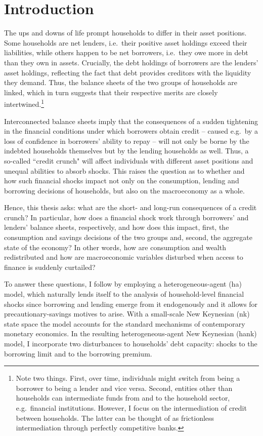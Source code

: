 \documentclass[a4paper,12pt]{article} %
\numberwithin{equation}{section} %
\numberwithin{figure}{section}
\numberwithin{table}{section}
\begin{document}
\section{Introduction}
\label{sec:introduction}

The ups and downs of life prompt households to differ in their asset positions. Some households are net lenders, i.e.~their positive asset holdings exceed their liabilities, while others happen to be net borrowers, i.e.~they owe more in debt than they own in assets. Crucially, the debt holdings of borrowers are the lenders' asset holdings, reflecting the fact that debt provides creditors with the liquidity they demand. Thus, the balance sheets of the two groups of households are linked, which in turn suggests that their respective merits are closely intertwined.\footnote{Note two things. First, over time, individuals might switch from being a borrower to being a lender and vice versa. Second, entities other than households can intermediate funds from and to the household sector, e.g.~financial institutions. However, I focus on the intermediation of credit between households. The latter can be thought of as frictionless intermediation through perfectly competitive banks.}

Interconnected balance sheets imply that the consequences of a sudden tightening in the financial conditions under which borrowers obtain credit -- caused e.g.~by a loss of confidence in borrowers' ability to repay -- will not only be borne by the indebted households themselves but by the lending households as well. Thus, a so-called ``credit crunch" will affect individuals with different asset positions and unequal abilities to absorb shocks. This raises the question as to whether and how such financial shocks impact not only on the consumption, lending and borrowing decisions of households, but also on the macroeconomy as a whole. 

Hence, this thesis asks: what are the short- and long-run consequences of a credit crunch? In particular, how does a financial shock work through borrowers' and lenders' balance sheets, respectively, and how does this impact, first, the consumption and savings decisions of the two groups and, second, the aggregate state of the economy? In other words, how are consumption and wealth redistributed and how are macroeconomic variables disturbed when access to finance is suddenly curtailed?

To answer these questions, I follow \textcite{gl2017} by employing a heterogeneous-agent (\Gls{ha}) model, which naturally lends itself to the analysis of household-level financial shocks since borrowing and lending emerge from it endogenously and it allows for precautionary-savings motives to arise. With a small-scale New Keynesian (\Gls{nk}) state space the model accounts for the standard mechanisms of contemporary monetary economics. In the resulting heterogeneous-agent New Keynesian (\Gls{hank}) model, I incorporate two disturbances to households' debt capacity: shocks to the borrowing limit and to the borrowing premium.
\end{document}
